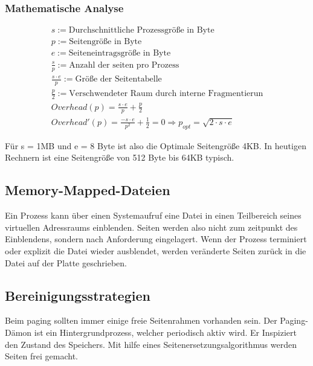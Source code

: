 \subsubsection*{Mathematische Analyse}

\begin{align*}
    s := \text{Durchschnittliche Prozessgröße in Byte}                    \\
    p := \text{Seitengröße in Byte}                                       \\
    e := \text{Seiteneintragsgröße in Byte}                               \\
    \frac{s}{p} := \text{Anzahl der seiten pro Prozess}                   \\
    \frac{s \cdot e}{p} := \text{Größe der Seitentabelle}                 \\
    \frac{p}{2} := \text{Verschwendeter Raum durch interne Fragmentierun} \\
    Overhead(p) = \frac{s \cdot e}{p} + \frac{p}{2}                       \\
    Overhead'(p) = \frac{- s \cdot e}{p^2} + \frac{1}{2} = 0 \Rightarrow p_{opt} = \sqrt{2 \cdot s \cdot e}
\end{align*}

Für s = 1MB und e = 8 Byte ist also die Optimale Seitengröße 4KB. In heutigen
Rechnern ist eine Seitengröße von 512 Byte bis 64KB typisch.

\subsection{Memory-Mapped-Dateien}

Ein Prozess kann über einen Systemaufruf eine Datei in einen Teilbereich seines
virtuellen Adressraums einblenden. Seiten werden also nicht zum zeitpunkt des
Einblendens, sondern nach Anforderung eingelagert. Wenn der Prozess terminiert
oder explizit die Datei wieder ausblendet, werden veränderte Seiten zurück in
die Datei auf der Platte geschrieben.

\subsection{Bereinigungsstrategien}

Beim paging sollten immer einige freie Seitenrahmen vorhanden sein. Der
Paging-Dämon ist ein Hintergrundprozess, welcher periodisch aktiv wird. Er
Inspiziert den Zustand des Speichers. Mit hilfe eines
Seitenersetzungsalgorithmus werden Seiten frei gemacht.

